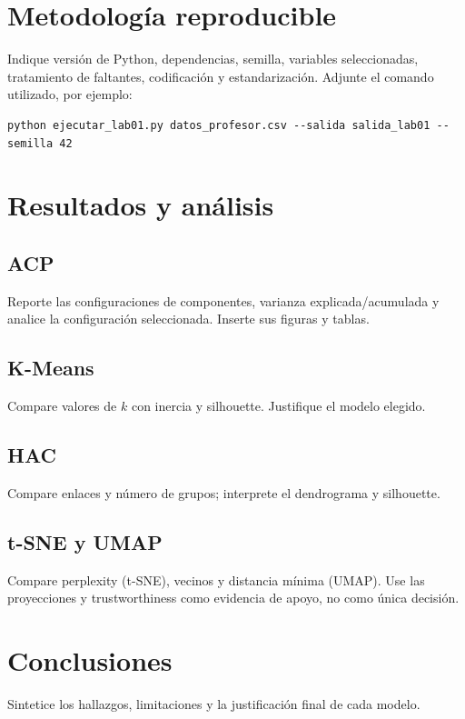 \documentclass[11pt]{article}
\begin{document}
\section{Metodología reproducible}
Indique versión de Python, dependencias, semilla, variables seleccionadas,
tratamiento de faltantes, codificación y estandarización. Adjunte el comando
utilizado, por ejemplo:
\begin{verbatim}
python ejecutar_lab01.py datos_profesor.csv --salida salida_lab01 --semilla 42
\end{verbatim}

\section{Resultados y análisis}
\subsection{ACP}
Reporte las configuraciones de componentes, varianza explicada/acumulada y
analice la configuración seleccionada. Inserte sus figuras y tablas.

\subsection{K-Means}
Compare valores de $k$ con inercia y silhouette. Justifique el modelo elegido.

\subsection{HAC}
Compare enlaces y número de grupos; interprete el dendrograma y silhouette.

\subsection{t-SNE y UMAP}
Compare perplexity (t-SNE), vecinos y distancia mínima (UMAP). Use las
proyecciones y trustworthiness como evidencia de apoyo, no como única decisión.

\section{Conclusiones}
Sintetice los hallazgos, limitaciones y la justificación final de cada modelo.



\end{document}
